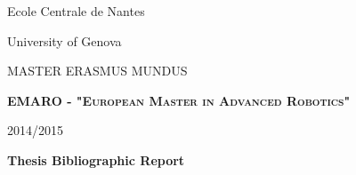 \begin{titlepage}
\singlespacing
     \noindent \begin{minipage}{0.5\textwidth}
	\begin{flushleft} 
	{\large Ecole Centrale de Nantes}
	\end{flushleft}
	\end{minipage}
	\begin{minipage}{0.5\textwidth}
	\begin{flushright}
	{\large University of Genova}
    \end{flushright}	 
	\end{minipage}
\begin{figure}[H]
\center
\end{figure}
	\begin{center}
	\vspace*{0.2in}
	{\Large MASTER ERASMUS MUNDUS}
	
	\vspace{0.2in}	\textbf{\textsc{EMARO - "European Master in Advanced Robotics"}}
	
	\vspace{0.2in}	
	
	2014/2015
	
	\vspace{0.2in}
	
	\large \textbf{Thesis Bibliographic Report}
	
	\vspace{0.3in}
	

\end{center}
\end{titlepage}
